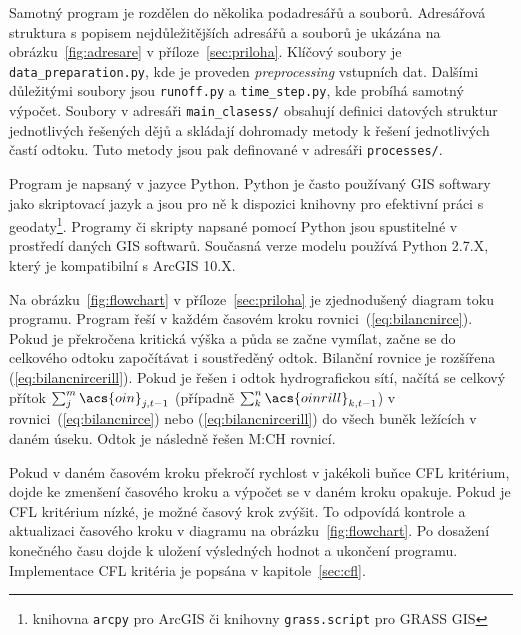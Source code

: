 Samotný program je rozdělen do několika podadresářů a souborů. Adresářová struktura s popisem nejdůležitějších adresářů a souborů je ukázána na obrázku~\ref{fig:adresare} v příloze~\ref{sec:priloha}. Klíčový soubory je {\tt data\_preparation.py}, kde je proveden {\it preprocessing} vstupních dat. Dalšími důležitými soubory jsou {\tt runoff.py} a {\tt time\_step.py}, kde probíhá samotný výpočet. Soubory v adresáři {\tt main\_clasess/} obsahují definici datových struktur jednotlivých řešených dějů a skládají dohromady metody k řešení jednotlivých častí odtoku. Tuto metody jsou pak definované v adresáři {\tt processes/}. 

Program \smod je napsaný v jazyce Python. Python je často používaný GIS softwary jako skriptovací jazyk a jsou pro ně k dispozici knihovny pro efektivní práci s geodaty\footnote{knihovna {\tt arcpy} pro ArcGIS či knihovny {\tt grass.script} pro GRASS GIS}. Programy či skripty napsané pomocí Python jsou spustitelné v prostředí daných GIS softwarů. Současná verze modelu \smod používá Python 2.7.X, který je kompatibilní s ArcGIS 10.X.

Na obrázku~\ref{fig:flowchart} v příloze~\ref{sec:priloha} je zjednodušený diagram toku programu. Program řeší v každém časovém kroku rovnici~(\ref{eq:bilancnirce}). Pokud je překročena kritická výška a půda se začne vymílat, začne se do celkového  odtoku  započítávat i soustředěný odtok. Bilanční rovnice je rozšířena (\ref{eq:bilancnircerill}). Pokud je řešen i odtok hydrografickou sítí, načítá se celkový přítok $\sum_j^m \acs{oin}_{j,t-1}$ (případně $\sum_k^n \acs{oinrill}_{k,t-1}$) v rovnici~(\ref{eq:bilancnirce})  nebo (\ref{eq:bilancnircerill}) do všech buněk ležících v daném úseku. Odtok je následně řešen M:CH rovnicí.

Pokud v daném časovém kroku překročí rychlost v jakékoli buňce \acs{CFL} kritérium, dojde ke zmenšení časového kroku a výpočet se v daném kroku opakuje. Pokud je \acs{CFL} kritérium nízké, je možné časový krok zvýšit. To odpovídá kontrole a aktualizaci časového kroku v diagramu na obrázku~\ref{fig:flowchart}. Po dosažení konečného času dojde k uložení výsledných hodnot a ukončení programu. Implementace \acs{CFL} kritéria je popsána v kapitole~\ref{sec:cfl}.





% 
% 

